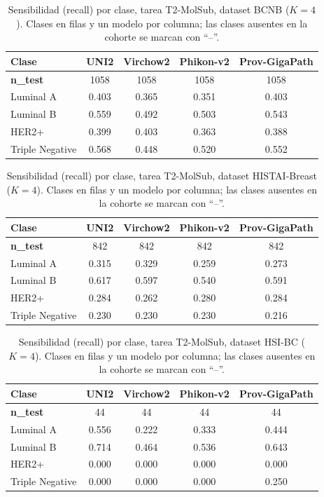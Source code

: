 \begin{table}[H]
\centering
\caption{Sensibilidad (recall) por clase, tarea T2-MolSub, dataset BCNB ($K=4$). Clases en filas y un modelo por columna; las clases ausentes en la cohorte se marcan con ``--''.}
\label{tab:anexo_molsub_sensibilidad}
\begin{tabular}{l c c c c}
\toprule
\textbf{Clase} & \textbf{UNI2} & \textbf{Virchow2} & \textbf{Phikon-v2} & \textbf{Prov-GigaPath} \\
\midrule
\textbf{n\_test} & 1058 & 1058 & 1058 & 1058 \\
Luminal A & 0.403 & 0.365 & 0.351 & 0.403 \\
Luminal B & 0.559 & 0.492 & 0.503 & 0.543 \\
HER2+ & 0.399 & 0.403 & 0.363 & 0.388 \\
Triple Negative & 0.568 & 0.448 & 0.520 & 0.552 \\
\bottomrule
\end{tabular}
\end{table}

\begin{table}[H]
\centering
\caption{Sensibilidad (recall) por clase, tarea T2-MolSub, dataset HISTAI-Breast ($K=4$). Clases en filas y un modelo por columna; las clases ausentes en la cohorte se marcan con ``--''.}
\label{tab:anexo_molsub_sensibilidad_histai}
\begin{tabular}{l c c c c}
\toprule
\textbf{Clase} & \textbf{UNI2} & \textbf{Virchow2} & \textbf{Phikon-v2} & \textbf{Prov-GigaPath} \\
\midrule
\textbf{n\_test} & 842 & 842 & 842 & 842 \\
Luminal A & 0.315 & 0.329 & 0.259 & 0.273 \\
Luminal B & 0.617 & 0.597 & 0.540 & 0.591 \\
HER2+ & 0.284 & 0.262 & 0.280 & 0.284 \\
Triple Negative & 0.230 & 0.230 & 0.230 & 0.216 \\
\bottomrule
\end{tabular}
\end{table}

\begin{table}[H]
\centering
\caption{Sensibilidad (recall) por clase, tarea T2-MolSub, dataset HSI-BC ($K=4$). Clases en filas y un modelo por columna; las clases ausentes en la cohorte se marcan con ``--''.}
\label{tab:anexo_molsub_sensibilidad_hsibc}
\begin{tabular}{l c c c c}
\toprule
\textbf{Clase} & \textbf{UNI2} & \textbf{Virchow2} & \textbf{Phikon-v2} & \textbf{Prov-GigaPath} \\
\midrule
\textbf{n\_test} & 44 & 44 & 44 & 44 \\
Luminal A & 0.556 & 0.222 & 0.333 & 0.444 \\
Luminal B & 0.714 & 0.464 & 0.536 & 0.643 \\
HER2+ & 0.000 & 0.000 & 0.000 & 0.000 \\
Triple Negative & 0.000 & 0.000 & 0.000 & 0.250 \\
\bottomrule
\end{tabular}
\end{table}

